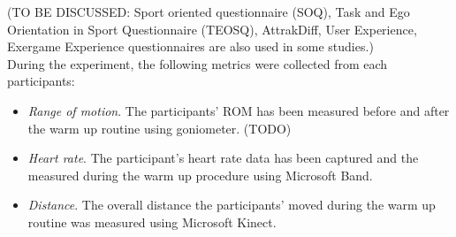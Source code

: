 (TO BE DISCUSSED: Sport oriented questionnaire (SOQ), Task and Ego Orientation in Sport Questionnaire (TEOSQ), AttrakDiff, User Experience, Exergame Experience questionnaires are also used in some studies.)\\
During the experiment, the following metrics were collected from each participants:
\begin{itemize}
\item \textit{Range of motion}. The participants' ROM has been measured before and after the warm up routine using goniometer. (TODO)
\item \textit{Heart rate}. The participant's heart rate data has been captured and the measured during the warm up procedure using Microsoft Band.
\item \textit{Distance}. The overall distance the participants' moved during the warm up routine was measured using Microsoft Kinect. 
\end{itemize}
